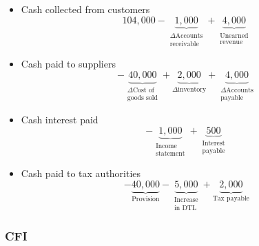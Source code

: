 \documentclass[../notes_compiled.tex]{subfiles}
\begin{document}
\begin{enumerate}
{\begin{itemize}
\item[] Cash collected from customers
\begin{equation*}
104,000 - \underbrace{1,000}_{\substack{\Delta \text{Accounts} \\ \text{receivable}}} + \underbrace{4,000}_{\substack{\text{Unearned} \\ \text{revenue}}}
\end{equation*}

\item[] Cash paid to suppliers
\begin{equation*}
- \underbrace{40,000}_{\substack{\Delta \text{Cost of} \\ \text{goods sold}}} + \underbrace{2,000}_{\Delta \text{inventory}} + \underbrace{4,000}_{\substack{\Delta \text{Accounts} \\ \text{payable}}}
\end{equation*}

\item[] Cash interest paid
\begin{equation*}
- \underbrace{1,000}_{\substack{\text{Income} \\ \text{statement}}} + \underbrace{500}_{\substack{\text{Interest} \\ \text{payable}}}
\end{equation*}

\item[] Cash paid to tax authorities
\begin{equation*}
- \underbrace{40,000}_{\text{Provision}} - \underbrace{5,000}_{\substack{\text{Increase} \\ \text{in DTL}}} + \underbrace{2,000}_{\text{Tax payable}}
\end{equation*}

\end{itemize}





}
\end{enumerate}













\subsubsection{CFI}
\end{document}
